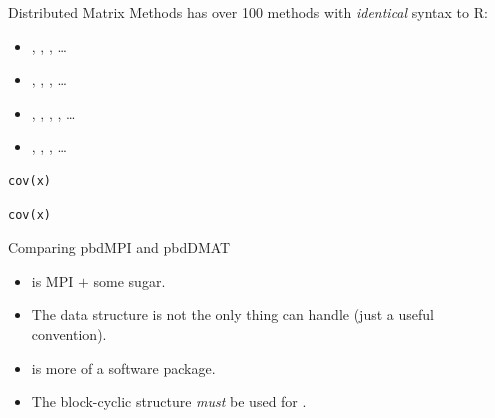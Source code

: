 \begin{frame}[fragile]
  \begin{block}{Distributed Matrix Methods}\pause
     has over 100 methods with \emph{identical} syntax to R:
    \begin{itemize}
     \item \code{\`{}[\`{}}, , , \dots
     \item {}, , , \dots
     \item \code{\`{}\%*\%\`{}}, , , , \dots
     \item {}, , , \dots
    \end{itemize}
\begin{lstlisting}[title=Serial Code]
cov(x)
\end{lstlisting}
  
\begin{lstlisting}[title=Parallel Code]
cov(x)
\end{lstlisting}
  \end{block}
\end{frame}

\begin{frame}[fragile]
  \begin{block}{Comparing pbdMPI and pbdDMAT}\pause
    \begin{itemize}
     \item {} is MPI $+$ some sugar.
     \item The  data structure is not the only thing  can handle (just a useful convention).
     \item {} is more of a software package.
     \item The block-cyclic  structure \emph{must} be used for .
    \end{itemize}
  \end{block}
\end{frame}


